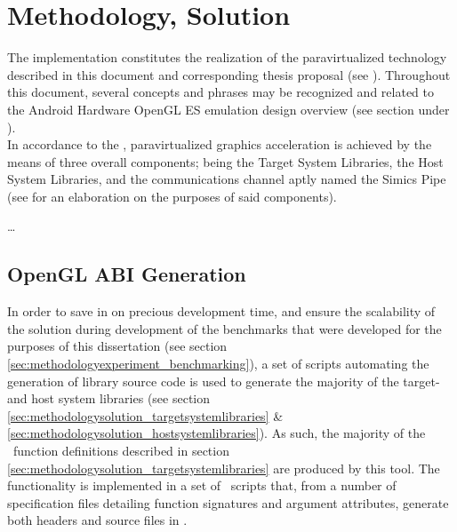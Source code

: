 
\chapter{Methodology, Solution}
\label{cha:methodologysolution}
The implementation constitutes the realization of the paravirtualized technology described in this document and corresponding thesis proposal (see ).
Throughout this document, several concepts and phrases may be recognized and related to the Android Hardware OpenGL ES emulation design overview (see section  under ).\\

\noindent
In accordance to the \dvttermreferenceimplementation , paravirtualized graphics acceleration is achieved by the means of three overall components; being the Target System Libraries, the Host System Libraries, and the communications channel aptly named the Simics Pipe (see  for an elaboration on the purposes of said components).

\ldots


\section{OpenGL ABI Generation}
\label{sec:methodologysolution_openglabigeneration}
In order to save in on precious development time, and ensure the scalability of the solution during development of the benchmarks that were developed for the purposes of this dissertation (see section \ref{sec:methodologyexperiment_benchmarking}), a set of scripts automating the generation of library source code is used to generate the majority of the target- and host system libraries (see section \ref{sec:methodologysolution_targetsystemlibraries} \& \ref{sec:methodologysolution_hostsystemlibraries}).
As such, the majority of the \dvttermopengl\ function definitions described in section \ref{sec:methodologysolution_targetsystemlibraries} are produced by this tool.
The functionality is implemented in a set of \dvttermpython\ scripts that, from a number of specification files detailing function signatures and argument attributes, generate both headers and source files in \dvttermc .

